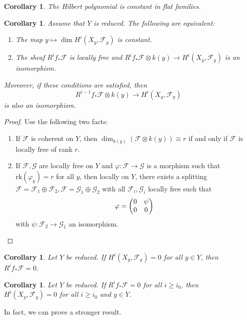 \documentclass[leqno, openany]{memoir}
\newtheorem{cor}[thm]{Corollary}
\theoremstyle{definition}
\theoremstyle{remark}
\theoremstyle{plain}
\theoremstyle{definition}
\theoremstyle{remark}
\newcommand{\mc}[1]{\mathcal{#1}}
\newcommand{\mr}[1]{\mathrm{#1}}
\begin{document}
\begin{cor}
    The Hilbert polynomial is constant in flat families. 
\end{cor}

\begin{cor}
    Assume that $Y$ is reduced. The following are equivalent:
    \begin{enumerate}
        \item The map $y \mapsto \dim H^i(X_y, \mc{F}_y)$ is constant.
        \item The sheaf $R^i f_* \mc{F}$ is locally free and $R^i f_* \mc{F} \otimes k(y) \to H^i(X_y, \mc{F}_y)$ is an isomorphism.
    \end{enumerate}
    Moreover, if these conditions are satisfied, then
    \[ R^{i-1} f_* \mc{F} \otimes k(y) \to H^i(X_y, \mc{F}_y) \]
    is also an isomorphism.
\end{cor}

\begin{proof}
    Use the following two facts:
    \begin{enumerate}
        \item If $\mc{F}$ is coherent on $Y$, then $\dim_{k(y)} (\mc{F} \otimes k(y)) \equiv r$ if and only if $\mc{F}$ is locally free of rank $r$.
        \item If $\mc{F}, \mc{G}$ are locally free on $Y$ and $\varphi \colon \mc{F} \to \mc{G}$ is a morphism such that $\mr{rk}(\varphi_y) = r$ for all $y$, then locally on $Y$, there exists a splitting $\mc{F} = \mc{F}_1 \oplus \mc{F}_2, \mc{F} = \mc{G}_1 \oplus \mc{G}_2$ with all $\mc{F}_i, \mc{G}_i$ locally free such that
            \[ \varphi = \mqty( 0 & \psi \\ 0 & 0 ) \]
            with $\psi \colon \mc{F}_2 \to \mc{G}_1$ an isomorphism. \qedhere
    \end{enumerate}
\end{proof}

\begin{cor}
    Let $Y$ be reduced. If $H^i(X_y, \mc{F}_y) = 0$ for all $y \in Y$, then $R^i f_* \mc{F} = 0$.
\end{cor}

\begin{cor}
    Let $Y$ be reduced. If $R^i f_* \mc{F} = 0$ for all $i \geq i_0$, then $H^i(X_y, \mc{F}_y) = 0$ for all $i \geq i_0$ and $y \in Y$.
\end{cor}

In fact, we can prove a stronger result.
\end{document}
